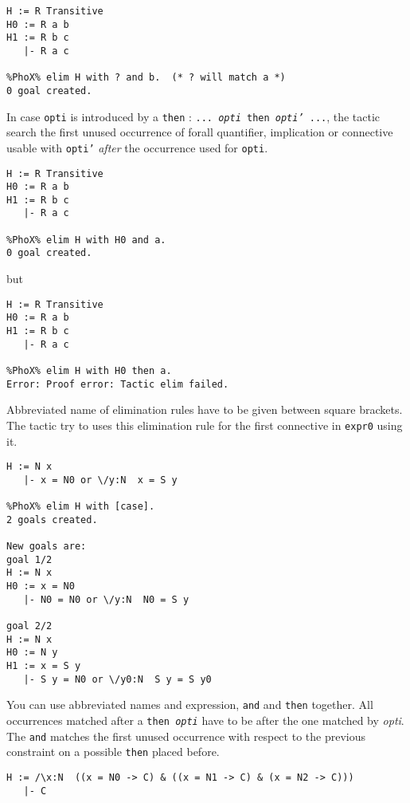 \begin{description}
\begin{verbatim}
H := R Transitive
H0 := R a b
H1 := R b c
   |- R a c

%PhoX% elim H with ? and b.  (* ? will match a *)
0 goal created.

\end{verbatim}

In case {\tt opti} is introduced by a {\tt then} : {\tt ... {\em opti}
then {\em opti'} ...},  the tactic search the first unused occurrence of
forall quantifier, implication or connective usable with {\tt opti'}
{\em after} the occurrence used for {\tt opti}.

\begin{verbatim}
H := R Transitive
H0 := R a b
H1 := R b c
   |- R a c

%PhoX% elim H with H0 and a.  
0 goal created.
\end{verbatim}

but 

\begin{verbatim}
H := R Transitive
H0 := R a b
H1 := R b c
   |- R a c

%PhoX% elim H with H0 then a.  
Error: Proof error: Tactic elim failed.
\end{verbatim}


Abbreviated name of elimination rules have to be given between square
brackets. The tactic try to uses this elimination rule for the first
connective in {\tt expr0} using it.

\begin{verbatim}
H := N x
   |- x = N0 or \/y:N  x = S y

%PhoX% elim H with [case].  
2 goals created.

New goals are:
goal 1/2
H := N x
H0 := x = N0
   |- N0 = N0 or \/y:N  N0 = S y

goal 2/2
H := N x
H0 := N y
H1 := x = S y
   |- S y = N0 or \/y0:N  S y = S y0
\end{verbatim}

You can use abbreviated names and expression, {\tt and} and {\tt then}
together. All occurrences matched after a {\tt then {\em opti}} have to
be after the one matched by {\em opti}. The {\tt and} matches the
first unused occurrence with respect to the previous constraint on a
possible {\tt then} placed before.

\begin{verbatim}
H := /\x:N  ((x = N0 -> C) & ((x = N1 -> C) & (x = N2 -> C)))
   |- C


\end{verbatim}
\end{description}
